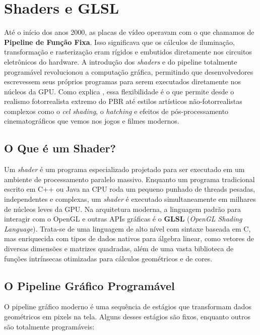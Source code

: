 \chapter{Shaders e GLSL}

Até o início dos anos 2000, as placas de vídeo operavam com o que chamamos de \textbf{Pipeline de Função Fixa}. Isso significava que os cálculos de iluminação, transformação e rasterização eram rígidos e embutidos diretamente nos circuitos eletrônicos do hardware. A introdução dos \textit{shaders} e do pipeline totalmente programável revolucionou a computação gráfica, permitindo que desenvolvedores escrevessem seus próprios programas para serem executados diretamente nos núcleos da GPU. Como explica \textcite{akenine2018realtime}, essa flexibilidade é o que permite desde o realismo fotorrealista extremo do PBR até estilos artísticos não-fotorrealistas complexos como o \textit{cel shading}, o \textit{hatching} e efeitos de pós-processamento cinematográficos que vemos nos jogos e filmes modernos.

\section{O Que é um Shader?}

Um \textit{shader} é um programa especializado projetado para ser executado em um ambiente de processamento paralelo massivo. Enquanto um programa tradicional escrito em C++ ou Java na CPU roda um pequeno punhado de threads pesadas, independentes e complexas, um \textit{shader} é executado simultaneamente em milhares de núcleos leves da GPU. Na arquitetura moderna, a linguagem padrão para interagir com o OpenGL e outras APIs gráficas é o \textbf{GLSL} (\textit{OpenGL Shading Language}). Trata-se de uma linguagem de alto nível com sintaxe baseada em C, mas enriquecida com tipos de dados nativos para álgebra linear, como vetores de diversas dimensões e matrizes quadradas, além de uma vasta biblioteca de funções intrínsecas otimizadas para cálculos geométricos e de cores.

\section{O Pipeline Gráfico Programável}

O pipeline gráfico moderno é uma sequência de estágios que transformam dados geométricos em pixels na tela. Alguns desses estágios são fixos, enquanto outros são totalmente programáveis:

